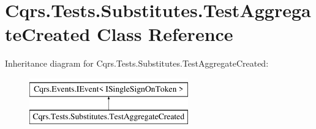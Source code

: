 \hypertarget{classCqrs_1_1Tests_1_1Substitutes_1_1TestAggregateCreated}{}\section{Cqrs.\+Tests.\+Substitutes.\+Test\+Aggregate\+Created Class Reference}
\label{classCqrs_1_1Tests_1_1Substitutes_1_1TestAggregateCreated}
Inheritance diagram for Cqrs.\+Tests.\+Substitutes.\+Test\+Aggregate\+Created\+:\begin{figure}[H]
\begin{center}
\leavevmode
\includegraphics[height=2.000000cm]{classCqrs_1_1Tests_1_1Substitutes_1_1TestAggregateCreated}
\end{center}
\end{figure}
